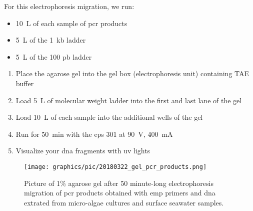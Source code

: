For this electrophoresis migration, we run:
\begin{itemize}
\item 10~\textmu L of each sample of \gls{pcr} products
\item 5~\textmu L of the 1~kb ladder
\item 5~\textmu L of the 100 pb ladder
\end{itemize}

\begin{enumerate}
\item Place the agarose gel into the gel box (electrophoresis unit) containing TAE buffer
\item Load 5~\textmu L of molecular weight ladder into the first and last lane of the gel
\item Load 10~\textmu L of each sample into the additional wells of the gel
\item Run for 50~min with the \gls{eps} 301 at 90~V, 400~mA
\item Visualize your \gls{dna} fragments with \gls{uv} lights
\end{enumerate}

\begin{figure}[H] %
    \centering
    \caption{Picture of 1\% agarose gel after 50 minute-long electrophoresis migration of \gls{pcr} products obtained with \gls{emp} primers and \gls{dna} extrated from micro-algae cultures and surface seawater samples.}
    \label{fig:20180322_gel_pcr_products}
    \texttt{[image: graphics/pic/20180322\_gel\_pcr\_products.png]}
\end{figure}
